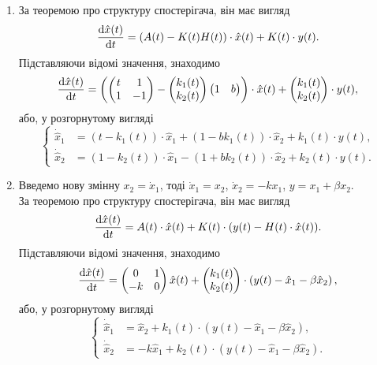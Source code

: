 \begin{solution}
    \begin{enumerate}
    	\item За теоремою про структуру спостерігача, він має вигляд \[ \frac{\mathop{}\!\mathrm{d} \hat x (t)}{\mathop{}\!\mathrm{d} t} = (A (t) - K (t) H (t)) \cdot \hat x (t) + K(t) \cdot y(t).\] Підставляючи відомі значення, знаходимо \[ \frac{\mathop{}\!\mathrm{d} \hat x (t)}{\mathop{}\!\mathrm{d} t} = \left(\begin{pmatrix} t & 1 \\ 1 & -1 \end{pmatrix} - \begin{pmatrix} k_1(t) \\ k_2(t) \end{pmatrix} \begin{pmatrix} 1 & b \end{pmatrix} \right) \cdot \hat x (t) + \begin{pmatrix} k_1(t) \\ k_2(t) \end{pmatrix} \cdot y(t),\] або, у розгорнутому вигляді \[ \left\{ \begin{aligned}
    		\dot{\hat{x}}_1 &= (t - k_1(t)) \cdot \hat x_1 + (1 - b k_1(t)) \cdot \hat x_2 + k_1(t) \cdot y(t), \\
    		\dot{\hat{x}}_2 &= (1 - k_2(t)) \cdot \hat x_1 - (1 + b k_2(t)) \cdot \hat x_2 + k_2 (t) \cdot y(t).
    	\end{aligned} \right. \]
    	\item Введемо нову змінну $x_2 = \dot x_1$, тоді $\dot x_1 = x_2$, $\dot x_2 = - k x_1$, $y = x_1 + \beta x_2$. \\

    	За теоремою про структуру спостерігача, він має вигляд \[ \frac{\mathop{}\!\mathrm{d} \hat x (t)}{\mathop{}\!\mathrm{d} t} = A (t) \cdot \hat x (t) + K(t) \cdot (y(t) - H(t) \cdot \hat x(t)).\] Підставляючи відомі значення, знаходимо \[ \frac{\mathop{}\!\mathrm{d} \hat x (t)}{\mathop{}\!\mathrm{d} t} = \begin{pmatrix} 0 & 1 \\ -k & 0 \end{pmatrix} \hat x(t) + \begin{pmatrix} k_1(t) \\ k_2(t) \end{pmatrix} \cdot \left(y(t) - \hat x_1 - \beta \hat x_2\right), \] або, у розгорнутому вигляді \[ \left\{ \begin{aligned}
    		\dot{\hat{x}}_1 &= \hat x_2 + k_1(t) \cdot \left(y(t) - \hat x_1 - \beta \hat x_2\right), \\
    		\dot{\hat{x}}_2 &= -k \hat x_1 + k_2(t) \cdot \left(y(t) - \hat x_1 - \beta \hat x_2\right).
    	\end{aligned} \right. \]
    \end{enumerate}
\end{solution}

